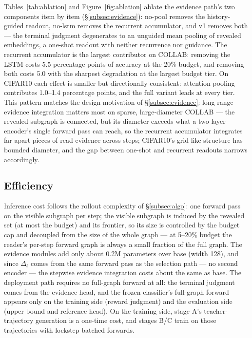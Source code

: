 \documentclass{article}
\begin{document}
Tables~\ref{tab:ablation} and Figure~\ref{fig:ablation} ablate the evidence path's two components item by item (\S\ref{subsec:evidence}): no-pool removes the history-guided readout, no-lstm removes the recurrent accumulator, and v1 removes both --- the terminal judgment degenerates to an unguided mean pooling of revealed embeddings, a one-shot readout with neither recurrence nor guidance. The recurrent accumulator is the largest contributor on COLLAB: removing the LSTM costs 5.5 percentage points of accuracy at the 20\% budget, and removing both costs 5.0 with the sharpest degradation at the largest budget tier. On CIFAR10 each effect is smaller but directionally consistent: attention pooling contributes 1.0--1.4 percentage points, and the full variant leads at every tier. This pattern matches the design motivation of \S\ref{subsec:evidence}: long-range evidence integration matters most on sparse, large-diameter COLLAB --- the revealed subgraph is connected, but its diameter exceeds what a two-layer encoder's single forward pass can reach, so the recurrent accumulator integrates far-apart pieces of read evidence across steps; CIFAR10's grid-like structure has bounded diameter, and the gap between one-shot and recurrent readouts narrows accordingly.

\subsection{Efficiency}
\label{subsec:efficiency}

Inference cost follows the rollout complexity of \S\ref{subsec:algo}: one forward pass on the visible subgraph per step; the visible subgraph is induced by the revealed set (at most the budget) and its frontier, so its size is controlled by the budget cap and decoupled from the size of the whole graph --- at 5--20\% budget the reader's per-step forward graph is always a small fraction of the full graph. The evidence modules add only about 0.2M parameters over base (width 128), and since $\Delta_t$ comes from the same forward pass as the selection path --- no second encoder --- the stepwise evidence integration costs about the same as base. The deployment path requires no full-graph forward at all: the terminal judgment comes from the evidence head, and the frozen classifier's full-graph forward appears only on the training side (reward judgment) and the evaluation side (upper bound and reference head). On the training side, stage A's teacher-trajectory generation is a one-time cost, and stages B/C train on those trajectories with lockstep batched forwards.
\end{document}
